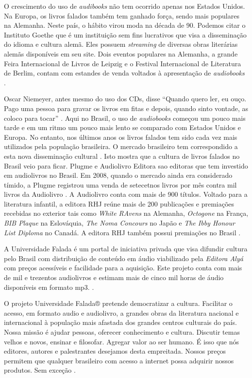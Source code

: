 O crescimento do uso de \textit{audibooks} não tem ocorrido apenas nos Estados Unidos. Na Europa, os livros falados também tem ganhado força, sendo mais populares na Alemanha. Neste país, o hábito virou moda na década de 90. Podemos citar o Instituto Goethe que é um instituição sem fins lucrativos que visa a disseminação do idioma e cultura alemã. Eles possuem \textit{streaming} de diversas obras literárias alemãs disponíveis em seu site. Dois eventos populares na Alemanha, a grande Feira Internacional de Livros de Leipzig e o Festival Internacional de Literatura de Berlim, contam com estandes de venda voltados à apresentação de \textit{audiobooks} \cite{dw}.

Oscar Niemeyer, antes mesmo do uso dos CDs, disse ``Quando quero ler, eu ouço. Pago uma pessoa para gravar os livros em fitas e depois, quando sinto vontade, as coloco para tocar'' \cite{audiobookinovacao}. Aqui no Brasil, o uso de \textit{audiobooks} começou um pouco mais tarde e em um ritmo um pouco mais lento se comparado com Estados Unidos e Europa. No entanto, nos últimos anos os livros falados tem sido cada vez mais utilizados pela população brasileira. O mercado brasileiro tem correspondido a esta nova disseminação cultural \cite{farias}. Isto mostra que a cultura de livros falados no Brasil veio para ficar. Plugme e Audiolivro Editora sao editoras que tem investido em audiolivros no Brasil. Em 2008, quando o mercado ainda era considerado tímido, a Plugme registrou uma venda de setecetnos livros por mês contra mil livros da Audiolivro \cite{audiobooksuporte}. A Audiolivro conta com mais de 900 títulos. Voltado para a literatura infantil, a editora RHJ reúne mais de 200 publicações e premiações recebidas no exterior tais como \textit{White RAvens} na Alemanha, \textit{Octogone} na França, \textit{BIB Plaque} na Eslováquia, \textit{The Noma Concours} no Japão e \textit{The Ibby Honour List Diploma} no Canadá. A editora RHJ também possui premiações no Brasil \cite{rhj}.

A Universidade Falada é um portal de iniciativa privada que visa difundir cultura pelo Brasil com distribuição de conteúdo em áudio viabilizado pela \textit{Editora Alyá} com preços acessíveis e facilidade para a aquisição. Este projeto conta com mais de mil e trezentos audiolivros e estimam mais de cinco mil horas de áudio disponíveis em formato mp3. \cite{universidadefalada}.

\begin{citacao}
O projeto Universidade Falada® pretende democratizar a cultura. Facilitar o acesso, em formato audio e audiolivro, a grandes obras da literatura nacional e internacional à população mais afastada dos grandes centros culturais do país. Nossa missão é ajudar pessoas, oferecer conhecimento e cultura. Discutir temas velhos e novos, ensinar e filosofar. Agregar valor ao ser humano. É isso que nós editores, autores e palestrantes desejamos desta empreitada. Nossos preços permitem que qualquer brasileiro com acesso a internet possa adquirir nossos produtos. Sem exceção \cite{universidadefalada}.
\end{citacao}

